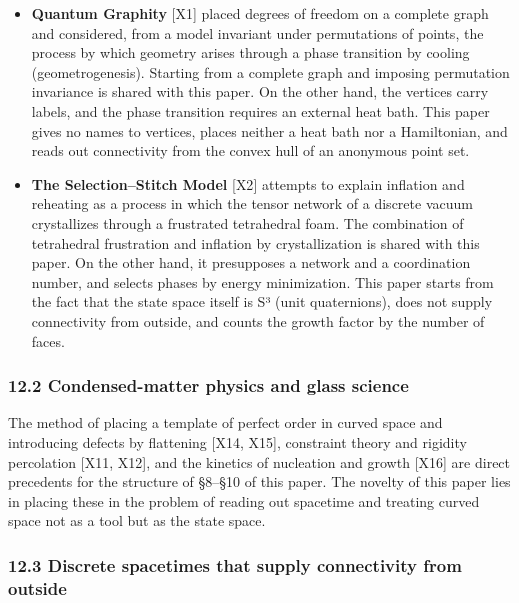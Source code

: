 \documentclass[
  a4paper,
]{article}
\providecommand{\tightlist}{%
  \setlength{\itemsep}{0pt}\setlength{\parskip}{0pt}}
\begin{document}
\begin{itemize}
\tightlist
\item
  \textbf{Quantum Graphity} {[}X1{]} placed degrees of freedom on a
  complete graph and considered, from a model invariant under
  permutations of points, the process by which geometry arises through a
  phase transition by cooling (geometrogenesis). Starting from a
  complete graph and imposing permutation invariance is shared with this
  paper. On the other hand, the vertices carry labels, and the phase
  transition requires an external heat bath. This paper gives no names
  to vertices, places neither a heat bath nor a Hamiltonian, and reads
  out connectivity from the convex hull of an anonymous point set.
\item
  \textbf{The Selection--Stitch Model} {[}X2{]} attempts to explain
  inflation and reheating as a process in which the tensor network of a
  discrete vacuum crystallizes through a frustrated tetrahedral foam.
  The combination of tetrahedral frustration and inflation by
  crystallization is shared with this paper. On the other hand, it
  presupposes a network and a coordination number, and selects phases by
  energy minimization. This paper starts from the fact that the state
  space itself is S³ (unit quaternions), does not supply connectivity
  from outside, and counts the growth factor by the number of faces.
\end{itemize}

\subsubsection{12.2 Condensed-matter physics and glass
science}\label{condensed-matter-physics-and-glass-science}

The method of placing a template of perfect order in curved space and
introducing defects by flattening {[}X14, X15{]}, constraint theory and
rigidity percolation {[}X11, X12{]}, and the kinetics of nucleation and
growth {[}X16{]} are direct precedents for the structure of §8--§10 of
this paper. The novelty of this paper lies in placing these in the
problem of reading out spacetime and treating curved space not as a tool
but as the state space.

\subsubsection{12.3 Discrete spacetimes that supply connectivity from
outside}\label{discrete-spacetimes-that-supply-connectivity-from-outside}
\end{document}
